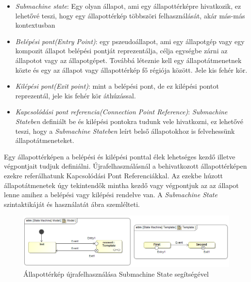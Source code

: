 \begin{itemize}
	\item \emph{Submachine state}: Egy olyan állapot, ami egy állapottérképre hivatkozik, ez lehetővé teszi, hogy egy állapottérkép többszöri felhasználását, akár más-más kontextusban
	\item \emph{Belépési pont(Entry Point)}: egy pszeudoállapot, ami egy állapotgép vagy egy kompozit állapot belépési pontját reprezentálja, célja egységbe zárni az állapotot vagy az állapotgépet. Továbbá léteznie kell egy állapotátmenetnek közte és egy az állapot vagy állapottérkép fő régiója között. Jele kis fehér kör.
	\item \emph{Kilépési pont(Exit point)}: mint a belépési pont, de ez kilépési pontot reprezentál, jele kis fehér kör áthúzással.
	\item \emph{Kapcsolódási pont referencia(Connection Point Reference)}: \emph{Submachine Stateben} definiált be és kilépési pontokra tudunk vele hivatkozni, ez lehetővé teszi, hogy a \emph{Submachine Stateben} leírt belső állapotokhoz is felvehessünk állapotátmeneteket.
	
\end{itemize}
Egy állapottérképen a belépési és kilépési ponttal élek lehetséges kezdő illetve végpontjait tudjuk definiálni. Újrafelhasználásnál a behivatkozott állapottérképen ezekre referálhatunk Kapcsolódási Pont Referenciákkal. Az ezekbe húzott állapotátmenetek úgy tekintendők mintha kezdő vagy végpontjuk az az állapot lenne amihez a belépési vagy kilépési rendelve van. A \emph{Submachine State} szintaktikáját és használatát   ábra szemlélteti.
\begin{figure}[!ht]
	\centering
	\includegraphics[keepaspectratio, width=150mm]{figures/statechart_elements/SubmachineState.png}
	\caption{Állapottérkép újrafelhasználása Submachine State segítségével}
	\label{fig:SubmachineState}
\end{figure}
